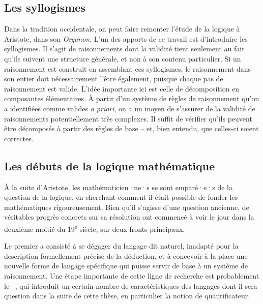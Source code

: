 \subsection{Les syllogismes}
Dans la tradition occidentale, on peut faire remonter l’étude de
la logique à Aristote, dans son \textit{Organon}.
L’un des apports de ce travail est d’introduire les syllogismes.
Il s’agit de raisonnements dont la validité tient seulement au fait qu’ils
suivent une structure générale, et non à son contenu particulier.
Si un raisonnement est construit en assemblant ces syllogismes,
le raisonnement dans son entier doit nécessairement l’être également, puisque
chaque pas de raisonnement est valide.
L’idée importante ici est celle de décomposition en composantes élémentaires. À
partir d’un système de règles de raisonnement qu’on a identifiées comme valides 
\textit{a priori},
on a un moyen de s’assurer de la validité de raisonnements potentiellement
très complexes.
Il suffit de vérifier qu’ils peuvent être décomposés à partir
des règles de base – et, bien entendu, que celles-ci soient correctes.

\subsection{Les débuts de la logique mathématique}
À la suite d’Aristote, les mathématicien·ne·s se sont emparé·e·s de la question
de la logique, en cherchant comment il était possible de fonder les mathématiques
rigoureusement. Bien qu’il s’agisse d’une question ancienne, de véritables
progrès concrets sur sa résolution ont commencé à voir le jour dans la deuxième
moitié du 19\textsuperscript{e} siècle, sur deux fronts principaux.

Le premier a consisté à se dégager du langage dit
naturel, inadapté pour la description formellement précise de la déduction, et à
concevoir à la place une nouvelle forme de langage spécifique qui puisse servir de
base à un système de raisonnement. Une étape importante
de cette ligne de recherche est
probablement le ~, qui introduit un certain nombre de
caractéristiques des langages dont il sera question dans la suite de cette thèse,
en particulier la notion de quantificateur.

